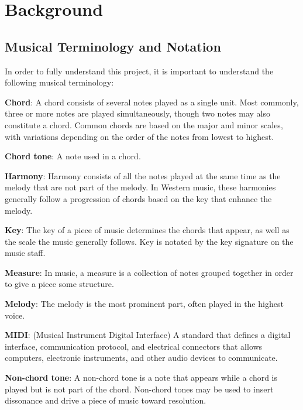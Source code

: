 \chapter{Background} \label{bg}


\section{Musical Terminology and Notation} \label{bg:musicTerminology}


In order to fully understand this project, it is important to understand the following musical terminology:

\textbf{Chord}: A chord consists of several notes played as a single unit.
Most commonly, three or more notes are played simultaneously, though two notes may also constitute a chord.
Common chords are based on the major and minor scales, with variations depending on the order of the notes from lowest to highest.

\textbf{Chord tone}: A note used in a chord.

\textbf{Harmony}: Harmony consists of all the notes played at the same time as the melody that are not part of the melody.
In Western music, these harmonies generally follow a progression of chords based on the key that enhance the melody.

\textbf{Key}: The key of a piece of music determines the chords that appear, as well as the scale the music generally follows.
Key is notated by the key signature on the music staff.

\textbf{Measure}: In music, a measure is a collection of notes grouped together in order to give a piece some structure.

\textbf{Melody}: The melody is the most prominent part, often played in the highest voice.

\textbf{MIDI}: (Musical Instrument Digital Interface) A standard that defines a digital interface, communication protocol, and electrical connectors that allows computers, electronic instruments, and other audio devices to communicate.

\textbf{Non-chord tone}: A non-chord tone is a note that appears while a chord is played but is not part of the chord.
Non-chord tones may be used to insert dissonance and drive a piece of music toward resolution.

